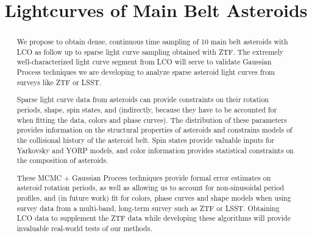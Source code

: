 \documentclass[11pt]{article}
\begin{document}
\title{Lightcurves of Main Belt Asteroids}



%


\begin{abstract}
We propose to obtain dense, continuous time sampling of 10 main belt asteroids with LCO as follow up to sparse light curve sampling obtained with ZTF. The extremely well-characterized light curve segment from LCO will serve to validate Gaussian Process techniques we are developing to analyze sparse asteroid light curves from surveys like ZTF or LSST.

Sparse light curve data from asteroids can provide constraints on their rotation periods, shape, spin states, and 
(indirectly, because they have to be accounted for when fitting the data, colors and phase curves). The distribution of
these parameters provides information on the structural properties of asteroids and constrains models of the collisional history
of the asteroid belt. Spin states provide valuable inputs for Yarkovsky and YORP models, and color information provides
statistical constraints on the composition of asteroids. 

These MCMC + Gaussian Process techniques provide formal error estimates on asteroid rotation periods, as well as allowing us to account for non-sinusoidal period profiles, and (in future work) fit for colors, phase curves and shape models when using survey data from a multi-band, long-term survey such as ZTF or LSST. Obtaining LCO data to supplement the ZTF data while developing these algorithms will provide invaluable real-world tests of our methods.

\end{abstract}

\end{document}
